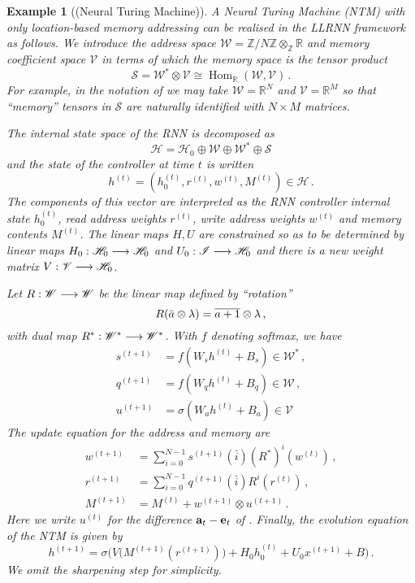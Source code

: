 \documentclass[english,letter paper,12pt,leqno]{article}
\theoremstyle{example}
\newtheorem{example}[theorem]{Example}
\numberwithin{equation}{section}
\def\Hom{\operatorname{Hom}}
\begin{document}
\begin{example}[(Neural Turing Machine)] A Neural Turing Machine (NTM) with only location-based memory addressing \cite{ntm} can be realised in the LLRNN framework as follows. We introduce the \emph{address space} $\mathscr{W} = \mathbb{Z}/N\mathbb{Z} \otimes_{\mathbb{Z}} \mathbb{R}$ and \emph{memory coefficient space} $\mathscr{V}$ in terms of which the \emph{memory space} is the tensor product
\[
\mathscr{S} = \mathscr{W}^* \otimes \mathscr{V} \cong \Hom_{\mathbb{R}}(\mathscr{W}, \mathscr{V})\,.
\]
For example, in the notation of \cite{ntm} we may take $\mathscr{W} = \mathbb{R}^N$ and $\mathscr{V} = \mathbb{R}^M$ so that ``memory'' tensors in $\mathscr{S}$ are naturally identified with $N \times M$ matrices. 

The internal state space of the RNN is decomposed as
\[
\mathscr{H} = \mathscr{H}_0 \oplus \mathscr{W} \oplus \mathscr{W}^* \oplus \mathscr{S}
\]
and the state of the controller at time $t$ is written
\[
h^{(t)} = (h_0^{(t)}, r^{(t)}, w^{(t)}, M^{(t)}) \in \mathscr{H}\,.
\]
The components of this vector are interpreted as the \emph{RNN controller internal state} $h_0^{(t)}$, \emph{read address weights} $r^{(t)}$, \emph{write address weights} $w^{(t)}$ and \emph{memory contents} $M^{(t)}$. The linear maps $H, U$ are constrained so as to be determined by linear maps $H_0: \mathscr{H}_0 \longrightarrow \mathscr{H}_0$ and $U_0: \mathscr{I} \longrightarrow \mathscr{H}_0$ and there is a new weight matrix $V: \mathscr{V} \longrightarrow \mathscr{H}_0$.

Let $R: \mathscr{W} \longrightarrow \mathscr{W}$ be the linear map defined by ``rotation''
\[
R( \Bar{a} \otimes \lambda ) = \overline{a+1} \otimes \lambda\,,
\]
with dual map $R^*: \mathscr{W}^* \longrightarrow \mathscr{W}^*$. With $f$ denoting softmax, we have
\begin{align*}
s^{(t+1)} &= f( W_s h^{(t)} + B_s ) \in \mathscr{W}^*\,,\\
q^{(t+1)} &= f( W_q h^{(t)} + B_q ) \in \mathscr{W}\,,\\
u^{(t+1)} &= \sigma( W_a h^{(t)} + B_a ) \in \mathscr{V}\,
\end{align*}
The update equation for the address \cite[Eq. (8)]{ntm} and memory \cite[Eq. (3),(4)]{ntm} are
\begin{align*}
w^{(t+1)} &= \sum_{i=0}^{N-1} s^{(t+1)}(\bar{i}) (R^*)^i( w^{(t)} )\,,
\\
r^{(t+1)} &= \sum_{i=0}^{N-1} q^{(t+1)}(\bar{i}) R^i( r^{(t)} )\,,\\
M^{(t+1)} &= M^{(t)} + w^{(t+1)} \otimes u^{(t+1)}\,.
\end{align*}
Here we write $u^{(t)}$ for the difference $\bold{a}_t - \bold{e}_t$ of \cite[\S 3.2]{ntm}. Finally, the evolution equation of the NTM is given by
\[
h^{(t+1)} = \sigma\Big( V\big( M^{(t+1)}(r^{(t+1)}) \big) + H_0 h_0^{(t)} + U_0 x^{(t+1)} + B \Big)\,.
\]
We omit the sharpening step \cite[Eq. (9)]{ntm} for simplicity.


\end{example}
\end{document}
